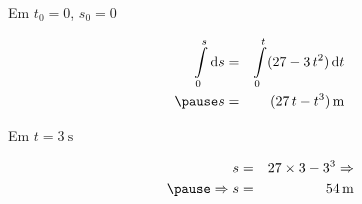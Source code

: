 \documentclass[12pt]{beamer}
\begin{document}
\begin{frame}
	Em $t_{0}=0$, $s_{0}=0$\pause
	
	\begin{eqnarray}
		\int\limits_{0}^{s}\text{d}s&=&\int\limits_{0}^{t}(27-3\,t^{2})\,\text{d}t\\\pause
		s&=&(27\,t-t^{3})\,\SI{}{\meter}
	\end{eqnarray}\pause

	Em $t=\SI{3}{\second}$\pause
	
	\begin{eqnarray}
		s&=&27\times 3-3^{3} \Rightarrow\\\pause
		\Rightarrow s&=&\SI{54}{\meter}
	\end{eqnarray}\pause
\end{frame}
\end{document}
